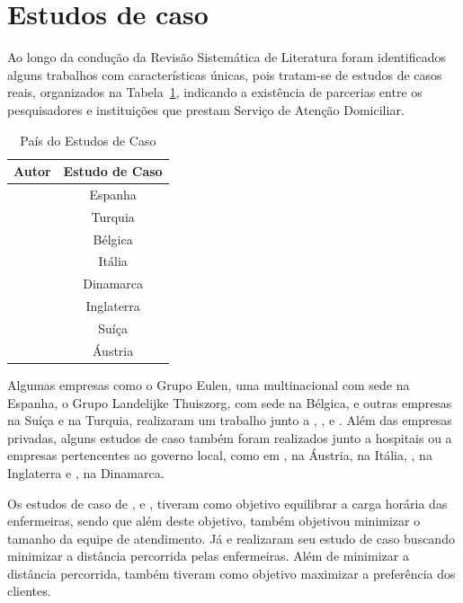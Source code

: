\section{\esp Estudos de caso }\label{casos}

Ao longo da condução da Revisão Sistemática de Literatura foram identificados alguns trabalhos com características únicas, pois tratam-se de estudos de casos reais, organizados na Tabela~\ref{estudo}, indicando a existência de parcerias entre os pesquisadores e instituições que prestam Serviço de Atenção Domiciliar.

\begin{table}[ht]
\centering
\caption{País do Estudos de Caso}
\label{estudo}
\begin{tabular}{c|c}
\hline
\textbf{Autor}                  & \textbf{Estudo de Caso} \\ \hline
\cite{luna:2013}  	       		& Espanha      \\ \hline
\cite{tozlu:2016}          		& Turquia    \\ \hline
\cite{goos:2015}           		& Bélgica        \\ \hline
\cite{cattafi:2012}        		& Itália      \\ \hline
\cite{rasmussenm:2012}		   	& Dinamarca	   \\ \hline
\cite{drake:2007}		 	   	& Inglaterra	  \\ \hline	
\cite{nguyen:2016}         		& Suíça         \\ \hline
\cite{trautsamwieser:2014} 		& Áustria      \\ \hline
\end{tabular}
\end{table}

Algumas empresas como o Grupo Eulen, uma multinacional com sede na Espanha, o Grupo Landelijke Thuiszorg, com sede na Bélgica, e outras empresas na Suíça e na Turquia, realizaram um trabalho junto a , ,  e . 
Além das empresas privadas, alguns estudos de caso também foram realizados junto a hospitais ou a empresas pertencentes ao governo local, como em , na Áustria,  na Itália, , na Inglaterra e , na Dinamarca.

Os estudos de caso de ,  e , tiveram como objetivo equilibrar a carga horária das enfermeiras, sendo que além deste objetivo,  também objetivou minimizar o tamanho da equipe de atendimento.
Já  e  realizaram seu estudo de caso buscando minimizar a distância percorrida pelas enfermeiras. Além de minimizar a distância percorrida,  também tiveram como objetivo maximizar a preferência dos clientes.

